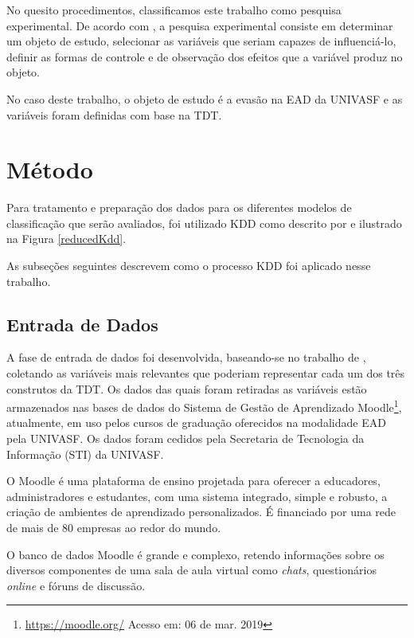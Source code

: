 No quesito procedimentos, classificamos este trabalho como pesquisa
experimental. De acordo com , a pesquisa
experimental consiste em determinar um objeto de estudo, selecionar as variáveis
que seriam capazes de influenciá-lo, definir as formas de controle e de
observação dos efeitos que a variável produz no objeto.

No caso deste trabalho, o objeto de estudo é a evasão na EAD da UNIVASF e as
variáveis foram definidas com base na TDT.

\section{Método}

Para tratamento e preparação dos dados para os diferentes modelos de
classificação que serão avaliados, foi utilizado KDD como descrito por
 e ilustrado na Figura \ref{reducedKdd}.


As subseções seguintes descrevem como o processo KDD foi aplicado nesse
trabalho.

\subsection{Entrada de Dados}
\label{dataEntrySection}

A fase de entrada de dados foi desenvolvida, baseando-se no trabalho de
, coletando as variáveis mais relevantes que
poderiam representar cada um dos três construtos da TDT. Os dados das quais
foram retiradas as variáveis estão armazenados nas bases de dados do Sistema de
Gestão de Aprendizado Moodle\footnote{\url{https://moodle.org/} Acesso em: 06 de
mar. 2019}, atualmente, em uso pelos cursos de graduação oferecidos na
modalidade EAD pela UNIVASF. Os dados foram cedidos pela Secretaria de
Tecnologia da Informação (STI) da UNIVASF.

O Moodle é uma plataforma de ensino projetada para oferecer a educadores,
administradores e estudantes, com uma sistema integrado, simple e robusto, a
criação de ambientes de aprendizado personalizados. É financiado por uma rede de
mais de 80 empresas ao redor do mundo.

O banco de dados Moodle é grande e complexo, retendo informações sobre os
diversos componentes de uma sala de aula virtual como \textit{chats},
questionários \textit{online} e fóruns de discussão.

